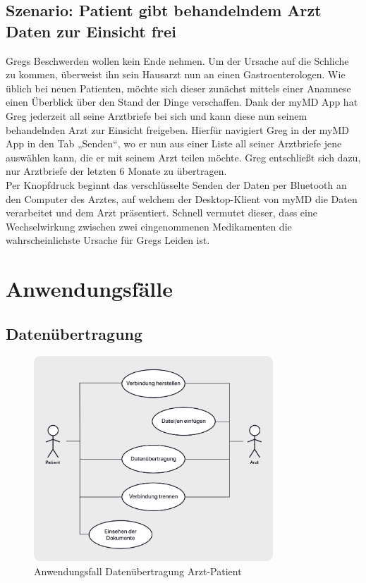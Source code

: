\documentclass[a4paper]{scrreprt}
\begin{document}
\subsection{Szenario: Patient gibt behandelndem Arzt Daten zur Einsicht frei}
Gregs Beschwerden wollen kein Ende nehmen. Um der Ursache auf die Schliche zu kommen, überweist ihn sein Hausarzt nun an einen Gastroenterologen. Wie üblich bei neuen Patienten, möchte sich dieser zunächst mittels einer Anamnese einen Überblick über den Stand der Dinge verschaffen. Dank der myMD \gls{App} hat Greg jederzeit all seine Arztbriefe bei sich und kann diese nun seinem behandelnden Arzt zur Einsicht freigeben. Hierfür navigiert Greg in der myMD App in den \gls{Tab} „Senden“, wo er nun aus einer Liste all seiner Arztbriefe jene auswählen kann, die er mit seinem Arzt teilen möchte. Greg entschließt sich dazu, nur Arztbriefe der letzten 6 Monate zu übertragen. \\
Per Knopfdruck beginnt das verschlüsselte Senden der Daten per \gls{Bluetooth} an den Computer des Arztes, auf welchem der Desktop-Klient von myMD die Daten verarbeitet und dem Arzt präsentiert. Schnell vermutet dieser, dass eine Wechselwirkung zwischen zwei eingenommenen Medikamenten die wahrscheinlichste Ursache für Gregs Leiden ist.

\section{Anwendungsfälle}
\subsection{Datenübertragung}
\begin{figure}[H]
\centering
\includegraphics[width=0.8\textwidth]{graphics/AF-ArztPatient}
\caption{Anwendungsfall Datenübertragung Arzt-Patient}
\end{figure}
\end{document}
